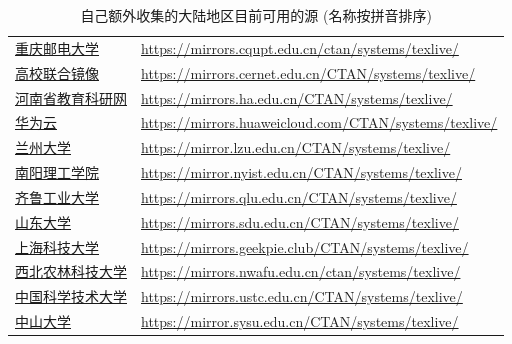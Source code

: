 \begin{table}
  \centering
  \caption{自己额外收集的大陆地区目前可用的源 (名称按拼音排序)}\label{tab:appendix:mirror-addition}
  \begin{tabular}{p{8\ccwd}p{58\ttwd}}
    \hline\hline
    \href{https://mirrors.cqupt.edu.cn/}{重庆邮电大学}
    & \url{https://mirrors.cqupt.edu.cn/ctan/systems/texlive/}\\
    \href{https://mirrors.cernet.edu.cn/}{高校联合镜像}
    & \url{https://mirrors.cernet.edu.cn/CTAN/systems/texlive/}\\
    \href{https://mirrors.ha.edu.cn/}{河南省教育科研网}
    & \url{https://mirrors.ha.edu.cn/CTAN/systems/texlive/}\\
    \href{https://mirrors.huaweicloud.com/}{华为云}
    & \url{https://mirrors.huaweicloud.com/CTAN/systems/texlive/}\\
    \href{https://mirror.lzu.edu.cn/}{兰州大学}
    & \url{https://mirror.lzu.edu.cn/CTAN/systems/texlive/}\\
    \href{https://mirror.nyist.edu.cn/}{南阳理工学院}
    & \url{https://mirror.nyist.edu.cn/CTAN/systems/texlive/}\\
    \href{https://mirrors.qlu.edu.cn/}{齐鲁工业大学}
    & \url{https://mirrors.qlu.edu.cn/CTAN/systems/texlive/}\\
    \href{https://mirrors.sdu.edu.cn/}{山东大学}
    & \url{https://mirrors.sdu.edu.cn/CTAN/systems/texlive/}\\
    \href{https://mirrors.geekpie.club/}{上海科技大学}
    & \url{https://mirrors.geekpie.club/CTAN/systems/texlive/}\\
    \href{https://mirrors.nwafu.edu.cn/}{西北农林科技大学}
    & \url{https://mirrors.nwafu.edu.cn/ctan/systems/texlive/}\\
    \href{https://mirrors.ustc.edu.cn/}{中国科学技术大学}
    & \url{https://mirrors.ustc.edu.cn/CTAN/systems/texlive/}\\
    \href{https://mirrors.sysu.edu.cn/}{中山大学}
    & \url{https://mirror.sysu.edu.cn/CTAN/systems/texlive/}\\
    \hline\hline
  \end{tabular}
\end{table}

